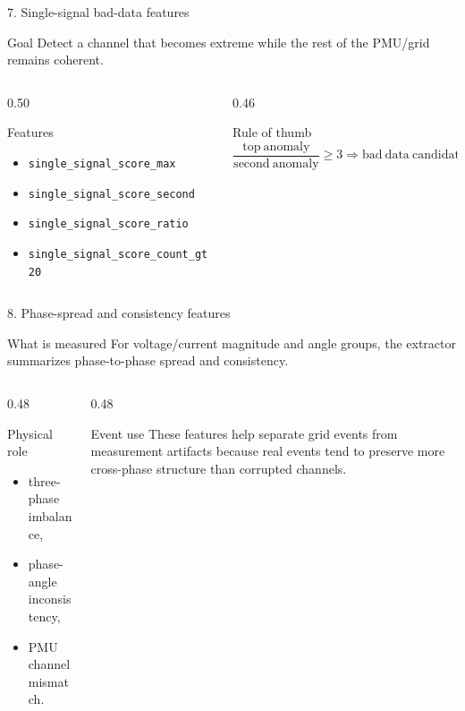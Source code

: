 \documentclass[10pt,aspectratio=169]{beamer}
\newcommand{\code}[1]{\texttt{\footnotesize #1}}
\begin{document}
\begin{frame}{7. Single-signal bad-data features}
\small
\begin{block}{Goal}
Detect a channel that becomes extreme while the rest of the PMU/grid remains coherent.
\end{block}
\begin{columns}[T,totalwidth=\textwidth]
\begin{column}{0.50\textwidth}
\begin{exampleblock}{Features}
\begin{itemize}
  \item \code{single\_signal\_score\_max}
  \item \code{single\_signal\_score\_second}
  \item \code{single\_signal\_score\_ratio}
  \item \code{single\_signal\_score\_count\_gt20}
\end{itemize}
\end{exampleblock}
\end{column}
\begin{column}{0.46\textwidth}
\begin{alertblock}{Rule of thumb}
\[
\frac{\mathrm{top\ anomaly}}{\mathrm{second\ anomaly}} \ge 3
\Rightarrow \mathrm{bad\ data\ candidate}
\]
\end{alertblock}
\end{column}
\end{columns}
\end{frame}

\begin{frame}{8. Phase-spread and consistency features}
\small
\begin{block}{What is measured}
For voltage/current magnitude and angle groups, the extractor summarizes phase-to-phase spread and consistency.
\end{block}
\begin{columns}[T,totalwidth=\textwidth]
\begin{column}{0.48\textwidth}
\begin{exampleblock}{Physical role}
\begin{itemize}
  \item three-phase imbalance,
  \item phase-angle inconsistency,
  \item PMU channel mismatch.
\end{itemize}
\end{exampleblock}
\end{column}
\begin{column}{0.48\textwidth}
\begin{alertblock}{Event use}
These features help separate grid events from measurement artifacts because real events tend to preserve more cross-phase structure than corrupted channels.
\end{alertblock}
\end{column}
\end{columns}
\end{frame}
\end{document}
